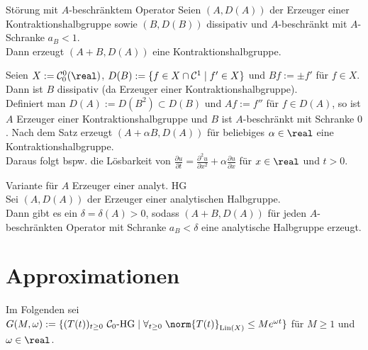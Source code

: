 \begin{Satz}{Störung mit $A$-beschränktem Operator}
    Seien $(A, D(A))$ der Erzeuger einer Kontraktionshalbgruppe sowie
    $(B, D(B))$ dissipativ und $A$-beschränkt mit $A$-Schranke $a_B < 1$.\\
    Dann erzeugt $(A + B, D(A))$ eine Kontraktionshalbgruppe.
\end{Satz}

\begin{Bsp}
    Seien $X := \C_0^0(\real)$, $D(B) := \{f \in X \cap \mathcal{C}^1 \;|\; f' \in X\}$ und
    $Bf := \pm f'$ für $f \in X$.\\
    Dann ist $B$ dissipativ (da Erzeuger einer Kontraktionshalbgruppe).\\
    Definiert man $D(A) := D(B^2) \subset D(B)$ und $Af := f''$ für $f \in D(A)$,
    so ist $A$ Erzeuger einer Kontraktionshalbgruppe und
    $B$ ist $A$-beschränkt mit Schranke $0$.
    Nach dem Satz erzeugt $(A + \alpha B, D(A))$ für beliebiges $\alpha \in \real$ eine
    Kontraktionshalbgruppe.\\
    Daraus folgt bspw. die Lösbarkeit von
    $\frac{\partial u}{\partial t} =
    \frac{\partial^2 u}{\partial x^2} + \alpha \frac{\partial u}{\partial x}$
    für $x \in \real$ und $t > 0$.
\end{Bsp}

\linie

\begin{Satz}{Variante für $A$ Erzeuger einer analyt. HG}\\
    Sei $(A, D(A))$ der Erzeuger einer analytischen Halbgruppe.\\
    Dann gibt es ein $\delta = \delta(A) > 0$, sodass
    $(A + B, D(A))$ für jeden $A$-beschränkten Operator mit Schranke $a_B < \delta$
    eine analytische Halbgruppe erzeugt.
\end{Satz}

\pagebreak

\section{%
    Approximationen%
}

\begin{Bem}
    Im Folgenden sei $G(M, \omega) := \{\text{$(T(t))_{t \ge 0}$ $\C_0$-HG} \;|\;
    \forall_{t \ge 0}\; \norm{T(t)}_{\Lin(X)} \le Me^{\omega t}\}$
    für $M \ge 1$ und $\omega \in \real$.
\end{Bem}

